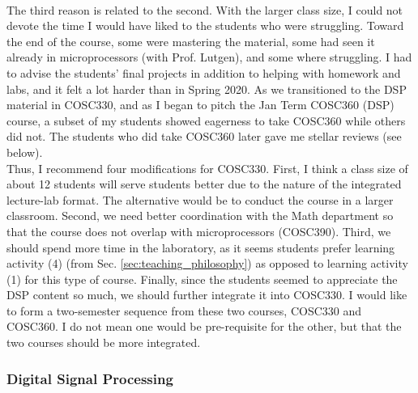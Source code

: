 \documentclass[../../main.tex]{subfiles}
\begin{document}
\\
\vspace{0.25cm}
The third reason is related to the second.  With the larger class size, I could not devote the time I would have liked to the students who were struggling.  Toward the end of the course, some were mastering the material, some had seen it already in microprocessors (with Prof. Lutgen), and some where struggling.  I had to advise the students' final projects in addition to helping with homework and labs, and it felt a lot harder than in Spring 2020.  As we transitioned to the DSP material in COSC330, and as I began to pitch the Jan Term COSC360 (DSP) course, a subset of my students showed eagerness to take COSC360 while others did not.  The students who did take COSC360 later gave me stellar reviews (see below).
\\
\vspace{0.25cm}
Thus, I recommend four modifications for COSC330.  First, I think a class size of about 12 students will serve students better due to the nature of the integrated lecture-lab format.  The alternative would be to conduct the course in a larger classroom.  Second, we need better coordination with the Math department so that the course does not overlap with microprocessors (COSC390).  Third, we should spend more time in the laboratory, as it seems students prefer learning activity (4) (from Sec. \ref{sec:teaching_philosophy}) as opposed to learning activity (1) for this type of course.  Finally, since the students seemed to appreciate the DSP content so much, we should further integrate it into COSC330.  I would like to form a two-semester sequence from these two courses, COSC330 and COSC360.  I do not mean one would be pre-requisite for the other, but that the two courses should be more integrated.

\subsubsection{Digital Signal Processing}
\end{document}
